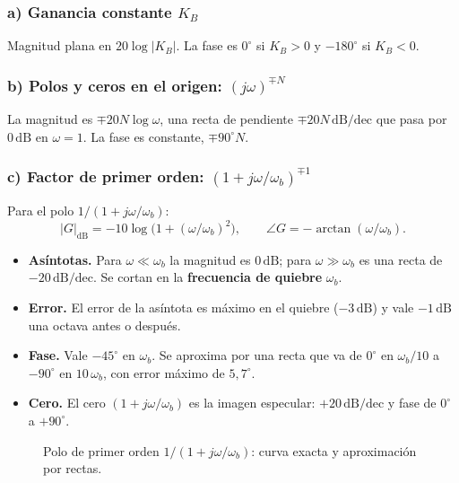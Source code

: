 \documentclass[11pt,a4paper]{article}
\newcommand{\dB}{\,\mathrm{dB}}
\newcommand{\dBdec}{\,\mathrm{dB/dec}}
\newcommand{\jw}{j\omega}
\begin{document}
\subsubsection{a) Ganancia constante $K_B$}
Magnitud plana en $20\log|K_B|$. La fase es $0^\circ$ si $K_B>0$ y $-180^\circ$ si $K_B<0$.

\subsubsection{b) Polos y ceros en el origen: $(\jw)^{\mp N}$}
La magnitud es $\mp 20N\log\omega$, una recta de pendiente $\mp20N\dBdec$ que pasa por $0\dB$ en $\omega=1$.
La fase es constante, $\mp90^\circ N$.

\subsubsection{c) Factor de primer orden: $(1+\jw/\omega_b)^{\mp1}$}
Para el polo $1/(1+\jw/\omega_b)$:
\[
|G|_{\mathrm{dB}}=-10\log\!\big(1+(\omega/\omega_b)^2\big),\qquad \angle G=-\arctan(\omega/\omega_b).
\]
\begin{itemize}
\item \textbf{Asíntotas.} Para $\omega\ll\omega_b$ la magnitud es $0\dB$; para $\omega\gg\omega_b$ es una recta de
      $-20\dBdec$. Se cortan en la \textbf{frecuencia de quiebre} $\omega_b$.
\item \textbf{Error.} El error de la asíntota es máximo en el quiebre ($-3\dB$) y vale $-1\dB$ una octava antes o después.
\item \textbf{Fase.} Vale $-45^\circ$ en $\omega_b$. Se aproxima por una recta que va de $0^\circ$ en
      $\omega_b/10$ a $-90^\circ$ en $10\,\omega_b$, con error máximo de $5{,}7^\circ$.
\item \textbf{Cero.} El cero $(1+\jw/\omega_b)$ es la imagen especular: $+20\dBdec$ y fase de $0^\circ$ a $+90^\circ$.
\end{itemize}

\begin{figure}[ht]
\centering
{}
\caption{Polo de primer orden $1/(1+\jw/\omega_b)$: curva exacta y aproximación por rectas.}
\label{fig:primer}
\end{figure}
\end{document}
